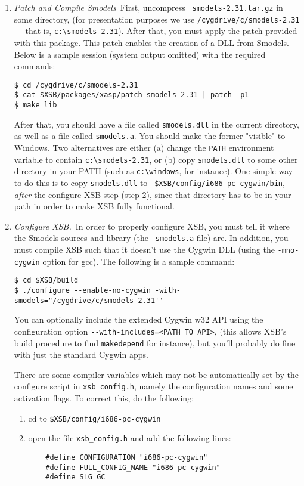 \begin{enumerate}
\item {\em Patch and Compile Smodels}\ First, uncompress {\tt
  smodels-2.31.tar.gz} in some directory, (for presentation purposes
  we use {\tt /cygdrive/c/smodels-2.31} --- that is,
  \verb|c:\smodels-2.31|). After that, you must apply the patch
  provided with this package. This patch enables the creation of a DLL
  from Smodels. Below is a sample session (system output omitted) with
  the required commands:
%
\begin{verbatim}
$ cd /cygdrive/c/smodels-2.31
$ cat $XSB/packages/xasp/patch-smodels-2.31 | patch -p1
$ make lib
\end{verbatim}
%
After that, you should have a file called {\tt smodels.dll} in the
current directory, as well as a file called {\tt smodels.a}. You
should make the former "visible" to Windows. Two alternatives are
either (a) change the {\tt PATH} environment variable to contain
\verb|c:\smodels-2.31|, or (b) copy {\tt smodels.dll} to some other
directory in your PATH (such as \verb|c:\windows|, for instance).  One
simple way to do this is to copy {\tt smodels.dll} to {\tt
  \$XSB/config/i686-pc-cygwin/bin}, {\em after} the configure XSB step
(step 2), since that directory has to be in your path in order to make
XSB fully functional.

\item{\em Configure XSB.}\ In order to properly configure XSB, you
  must tell it where the Smodels sources and library (the {\tt
    smodels.a} file) are. In addition, you must compile XSB such that
  it doesn't use the Cygwin DLL (using the {\tt -mno-cygwin} option
  for gcc). The following is a sample command:
%
\begin{verbatim}
$ cd $XSB/build
$ ./configure --enable-no-cygwin -with-smodels="/cygdrive/c/smodels-2.31''
\end{verbatim}
%
You can optionally include the extended Cygwin w32 API using the
configuration option \verb|--with-includes=<PATH_TO_API>|, (this
allows XSB's build procedure to find {\tt makedepend} for instance),
but you'll probably do fine with just the standard Cygwin apps.

There are some compiler variables which may not be automatically set
by the configure script in {\tt xsb\_config.h}, namely the
configuration names and some activation flags. To correct this, do the
following:

\begin{enumerate}
\item  cd to {\tt \$XSB/config/i686-pc-cygwin}
\item  open the file {\tt xsb\_config.h} and add the following lines:
\begin{verbatim}
	#define CONFIGURATION "i686-pc-cygwin"
	#define FULL_CONFIG_NAME "i686-pc-cygwin"
	#define SLG_GC
\end{verbatim}
\end{enumerate}


\end{enumerate}
